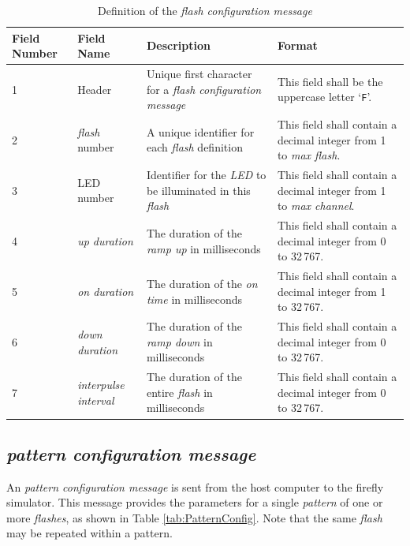 \documentclass[letterpaper,11pt]{article}
\begin{document}
\begin{table}[h]
\centering
\caption{Definition of the \textit{flash configuration message}}
\label{tab:FlashConfig}
\setlength\extrarowheight{2pt}
\begin{tabular}[h]{|p{0.5in}|p{1.00in}|p{2.25in}|p{2.25in}|} \hline
Field Number & Field Name & Description & Format \\ \hline
1            & Header
             & Unique first character for a \textit{flash configuration message}
             & This field shall be the uppercase letter `\texttt{F}'.
             \\ \hline
2            & \textit{flash} number
             & A unique identifier for each \textit{flash} definition
             & This field shall contain a decimal integer from 1 to
             \textit{max flash}.
             \\ \hline
3            & LED number
             & Identifier for the \textit{LED} to be illuminated in this
             \textit{flash}
             & This field shall contain a decimal integer from 1 to
             \textit{max channel}.
             \\ \hline
4            & \textit{up duration}
             & The duration of the \textit{ramp up} in milliseconds
             & This field shall contain a decimal integer from 0 to 32\,767.
             \\ \hline
5            & \textit{on duration}
             & The duration of the \textit{on time} in milliseconds
             & This field shall contain a decimal integer from 1 to 32\,767.
             \\ \hline
6            & \textit{down duration}
             & The duration of the \textit{ramp down} in milliseconds
             & This field shall contain a decimal integer from 0 to 32\,767.
             \\ \hline
7            & \textit{interpulse interval}
             & The duration of the entire \textit{flash} in milliseconds
             & This field shall contain a decimal integer from 0 to 32\,767.
             \\ \hline
\end{tabular}
\end{table}

\subsection{\textit{pattern configuration message}}

An \textit{pattern configuration message} is sent from the host computer to the
firefly simulator. This message provides the parameters for a single
\textit{pattern} of one or more \textit{flashes}, as shown in Table
\ref{tab:PatternConfig}. Note that the same \textit{flash} may be repeated
within a pattern.
\end{document}
